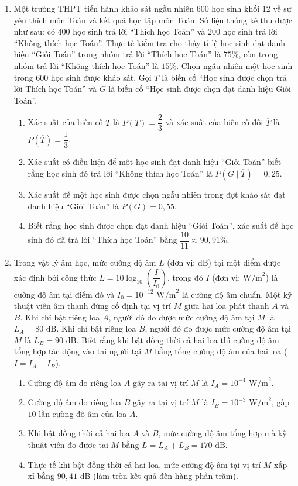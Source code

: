 \documentclass[12pt,a4paper]{article}
\begin{document}
\begin{enumerate}[label=\textbf{Câu \arabic*:}, leftmargin=*]
\item Một trường THPT tiến hành khảo sát ngẫu nhiên $600$ học sinh khối 12 về sự yêu thích môn Toán và kết quả học tập môn Toán. Số liệu thống kê thu được như sau: có $400$ học sinh trả lời ``Thích học Toán'' và $200$ học sinh trả lời ``Không thích học Toán''. Thực tế kiểm tra cho thấy tỉ lệ học sinh đạt danh hiệu ``Giỏi Toán'' trong nhóm trả lời ``Thích học Toán'' là $75\%$, còn trong nhóm trả lời ``Không thích học Toán'' là $15\%$. Chọn ngẫu nhiên một học sinh trong $600$ học sinh được khảo sát. Gọi $T$ là biến cố ``Học sinh được chọn trả lời Thích học Toán'' và $G$ là biến cố ``Học sinh được chọn đạt danh hiệu Giỏi Toán''.
\begin{enumerate}[label=\alph*)]
    \item Xác suất của biến cố $T$ là $P(T) = \dfrac{2}{3}$ và xác suất của biến cố đối $\overline{T}$ là $P(\overline{T}) = \dfrac{1}{3}$.
    \item Xác suất có điều kiện để một học sinh đạt danh hiệu ``Giỏi Toán'' biết rằng học sinh đó trả lời ``Không thích học Toán'' là $P(G \mid \overline{T}) = 0{,}25$.
    \item Xác suất để một học sinh được chọn ngẫu nhiên trong đợt khảo sát đạt danh hiệu ``Giỏi Toán'' là $P(G) = 0{,}55$.
    \item Biết rằng học sinh được chọn đạt danh hiệu ``Giỏi Toán'', xác suất để học sinh đó đã trả lời ``Thích học Toán'' bằng $\dfrac{10}{11} \approx 90{,}91\%$.
\end{enumerate}

\item Trong vật lý âm học, mức cường độ âm $L$ (đơn vị: $\text{dB}$) tại một điểm được xác định bởi công thức $L = 10\log_{10}\!\left(\dfrac{I}{I_0}\right)$, trong đó $I$ (đơn vị: $\text{W/m}^2$) là cường độ âm tại điểm đó và $I_0 = 10^{-12}\text{ W/m}^2$ là cường độ âm chuẩn. Một kỹ thuật viên âm thanh đứng cố định tại vị trí $M$ giữa hai loa phát thanh $A$ và $B$. Khi chỉ bật riêng loa $A$, người đó đo được mức cường độ âm tại $M$ là $L_A = 80\text{ dB}$. Khi chỉ bật riêng loa $B$, người đó đo được mức cường độ âm tại $M$ là $L_B = 90\text{ dB}$. Biết rằng khi bật đồng thời cả hai loa thì cường độ âm tổng hợp tác động vào tai người tại $M$ bằng tổng cường độ âm của hai loa ($I = I_A + I_B$).
\begin{enumerate}[label=\alph*)]
    \item Cường độ âm do riêng loa $A$ gây ra tại vị trí $M$ là $I_A = 10^{-4}\text{ W/m}^2$.
    \item Cường độ âm do riêng loa $B$ gây ra tại vị trí $M$ là $I_B = 10^{-3}\text{ W/m}^2$, gấp $10$ lần cường độ âm của loa $A$.
    \item Khi bật đồng thời cả hai loa $A$ và $B$, mức cường độ âm tổng hợp mà kỹ thuật viên đo được tại $M$ bằng $L = L_A + L_B = 170\text{ dB}$.
    \item Thực tế khi bật đồng thời cả hai loa, mức cường độ âm tại vị trí $M$ xấp xỉ bằng $90{,}41\text{ dB}$ (làm tròn kết quả đến hàng phần trăm).
\end{enumerate}


\end{enumerate}
\end{document}
